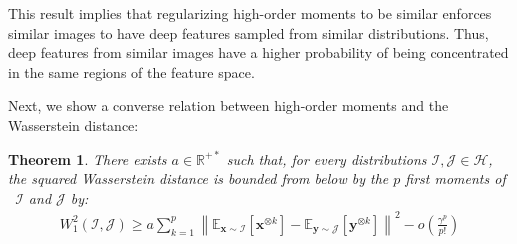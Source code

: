 \documentclass[10pt,twocolumn,letterpaper]{article}
\newtheorem{theorem}{Theorem}
\def\vx{{\bm{x}}}
\def\vy{{\bm{y}}}
\def\sR{{\mathbb{R}}}
\newcommand{\E}{\mathbb{E}}
\begin{document}
        This result implies that regularizing high-order moments to be similar enforces similar images to have deep features sampled from similar distributions.
        Thus, deep features from similar images have a higher probability of being concentrated in the same regions of the feature space.
        
        Next, we show a converse relation between high-order moments and the Wasserstein distance:
        \begin{theorem}
            There exists $a \in \sR^{+*}$ such that, for every distributions $\mathcal{I}, \mathcal{J} \in \mathcal{H}$, the squared Wasserstein distance is bounded from below by the $p$ first moments of \ $\mathcal{I}$ and $\mathcal{J}$ by:
            \begin{align}
                W_1^2(\mathcal{I}, \mathcal{J}) \geq a \sum_{k=1}^p \left\|\E_{\vx\sim \mathcal{I}}[\vx^{\otimes k}] - \E_{\vy\sim \mathcal{J}}[\vy^{\otimes k}]\right\|^2 - o(\frac{\gamma^p}{p!})
            \end{align}
        \end{theorem}
        
\end{document}
